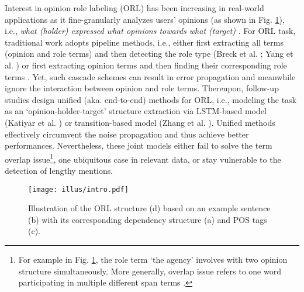 \documentclass[letterpaper]{article} \usepackage{aaai22}  \usepackage{times}  \usepackage{helvet}  \usepackage{courier}  \usepackage[hyphens]{url}  \usepackage{graphicx} \urlstyle{rm} \def\UrlFont{\rm}  \usepackage{natbib}  \usepackage{caption} \DeclareCaptionStyle{ruled}{labelfont=normalfont,labelsep=colon,strut=off} \frenchspacing  \setlength{\pdfpagewidth}{8.5in}  \setlength{\pdfpageheight}{11in}  \usepackage{algorithm}
\begin{document}
Interest in opinion role labeling (ORL) has been increasing in real-world applications as it fine-granularly analyzes users' opinions (as shown in Fig. \ref{Example-intro}), i.e., \emph{what (holder) expressed what opinions towards what (target)} \cite{kim-hovy-2006-extracting,Kannangara18,TangFYX19}.
For ORL task, traditional work adopts pipeline methods, i.e., either first extracting all terms (opinion and role terms) and then detecting the role type  (Breck et al. \citeyear{BreckCC07}; Yang et al. \citeyear{yang-cardie-2012-extracting}) or first extracting opinion terms and then finding their corresponding role terms \cite{zhang-etal-2019-enhancing,zhang-etal-2020-syntax}.
Yet, such cascade schemes can result in error propagation and meanwhile ignore the interaction between opinion and role terms.
Thereupon, follow-up studies design unified (aka. end-to-end) methods for ORL, i.e., modeling the task as an `opinion-holder-target' structure extraction via LSTM-based model (Katiyar et al. \citeyear{katiyar-cardie-2016-investigating}) or transition-based model (Zhang et al. \citeyear{ZhangWF19}).
Unified methods effectively circumvent the noise propagation and thus achieve better performances.
Nevertheless, these joint models either fail to solve the term overlap issue\footnote{
For example in Fig. \ref{Example-intro}, the role term `the agency' involves with two opinion structure simultaneously.
More generally, overlap issue refers to one word participating in multiple different span terms \cite{zeng-etal-2018-extracting,fei2020boundaries,li-etal-2021-span}.
}, one ubiquitous case in relevant data,
or stay vulnerable to the detection of lengthy mentions.





\begin{figure}[!t]
\centering
\texttt{[image: illus/intro.pdf]}
\caption{
Illustration of the ORL structure (d) based on an example sentence (b) with its corresponding dependency structure (a) and POS tags (c).
}
\label{Example-intro}
\end{figure}
\end{document}
